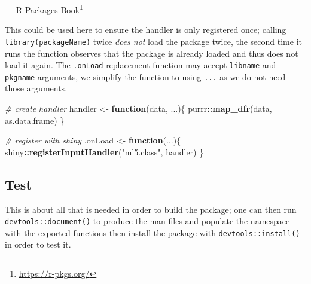 \documentclass[
]{krantz}
\makeatletter
\newenvironment{Shaded}{\begin{snugshade}}{\end{snugshade}}
\newcommand{\CommentTok}[1]{\textcolor[rgb]{0.37,0.37,0.37}{\textit{#1}}}
\newcommand{\ControlFlowTok}[1]{\textcolor[rgb]{0.27,0.27,0.27}{\textbf{#1}}}
\newcommand{\KeywordTok}[1]{\textcolor[rgb]{0.27,0.27,0.27}{\textbf{#1}}}
\newcommand{\NormalTok}[1]{#1}
\newcommand{\OperatorTok}[1]{\textcolor[rgb]{0.43,0.43,0.43}{\textbf{#1}}}
\newcommand{\StringTok}[1]{\textcolor[rgb]{0.5,0.5,0.5}{#1}}
\renewcommand{\href}[2]{#2\footnote{\url{#1}}}
\newenvironment{kframe}{%
\medskip{}
\setlength{\fboxsep}{.8em}
 \def\at@end@of@kframe{}%
 \ifinner\ifhmode%
  \def\at@end@of@kframe{\end{minipage}}%
  \begin{minipage}{\columnwidth}%
 \fi\fi%
 \def\FrameCommand##1{\hskip\@totalleftmargin \hskip-\fboxsep
 \colorbox{shadecolor}{##1}\hskip-\fboxsep
     \hskip-\linewidth \hskip-\@totalleftmargin \hskip\columnwidth}%
 \MakeFramed {\advance\hsize-\width
   \@totalleftmargin\z@ \linewidth\hsize
   \@setminipage}}%
 {\par\unskip\endMakeFramed%
 \at@end@of@kframe}
\renewenvironment{Shaded}{\begin{kframe}}{\end{kframe}}
\makeatother
\begin{document}
--- \href{https://r-pkgs.org/}{R Packages Book}

This could be used here to ensure the handler is only registered once; calling \texttt{library(packageName)} twice \emph{does not} load the package twice, the second time it runs the function observes that the package is already loaded and thus does not load it again. The \texttt{.onLoad} replacement function may accept \texttt{libname} and \texttt{pkgname} arguments, we simplify the function to using \texttt{...} as we do not need those arguments.

\begin{Shaded}
\begin{Highlighting}[]
\CommentTok{\# create handler}
\NormalTok{handler <{-}}\StringTok{ }\ControlFlowTok{function}\NormalTok{(data, ...)\{}
\NormalTok{  purrr}\OperatorTok{::}\KeywordTok{map\_dfr}\NormalTok{(data, as.data.frame)}
\NormalTok{\}}

\CommentTok{\# register with shiny}
\NormalTok{.onLoad <{-}}\StringTok{ }\ControlFlowTok{function}\NormalTok{(...)\{}
\NormalTok{  shiny}\OperatorTok{::}\KeywordTok{registerInputHandler}\NormalTok{(}\StringTok{"ml5.class"}\NormalTok{, handler)}
\NormalTok{\}}
\end{Highlighting}
\end{Shaded}

\hypertarget{shiny-complete-pkg-test}{%
\subsection{Test}\label{shiny-complete-pkg-test}}

This is about all that is needed in order to build the package; one can then run \texttt{devtools::document()} to produce the man files and populate the namespace with the exported functions then install the package with \texttt{devtools::install()} in order to test it.
\end{document}
